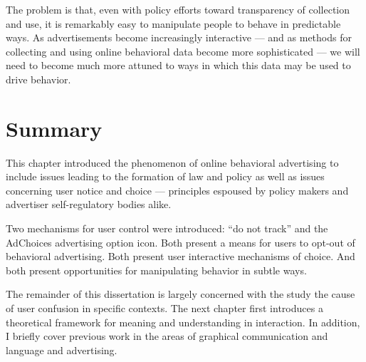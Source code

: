 The problem is that, even with policy efforts toward transparency of collection and use, it is remarkably easy to manipulate people to behave in predictable ways. As advertisements become increasingly interactive --- and as methods for collecting and using online behavioral data become more sophisticated --- we will need to become much more attuned to ways in which this data may be used to drive behavior. 

\section{Summary}
\label{summary}

This chapter introduced the phenomenon of online behavioral advertising to include issues leading to the formation of law and policy as well as issues concerning user notice and choice --- principles espoused by policy makers and advertiser self-regulatory bodies alike. 

Two mechanisms for user control were introduced: ``do not track'' and the AdChoices advertising option icon. Both present a means for users to opt-out of behavioral advertising. Both present user interactive mechanisms of choice. And both present opportunities for manipulating behavior in subtle ways.

The remainder of this dissertation is largely concerned with the study the cause of user confusion in specific contexts. The next chapter first introduces a theoretical framework for meaning and understanding in interaction. In addition, I briefly cover previous work in the areas of graphical communication and language and advertising.
